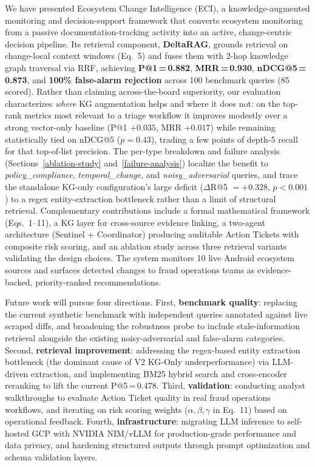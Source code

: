\documentclass[
]{article}
\begin{document}
We have presented Ecosystem Change Intelligence (ECI), a
knowledge-augmented monitoring and decision-support framework that
converts ecosystem monitoring from a passive documentation-tracking
activity into an active, change-centric decision pipeline. Its retrieval
component, \textbf{DeltaRAG}, grounds retrieval on change-local context
windows (Eq.~5) and fuses them with 2-hop knowledge graph traversal via
RRF, achieving \textbf{P@1\,=\,0.882}, \textbf{MRR\,=\,0.930},
\textbf{nDCG@5\,=\,0.873}, and \textbf{100\% false-alarm rejection}
across 100 benchmark queries (85 scored). Rather than claiming
across-the-board superiority, our evaluation characterizes \emph{where}
KG augmentation helps and where it does not: on the top-rank metrics
most relevant to a triage workflow it improves modestly over a strong
vector-only baseline (P@1 $+0.035$, MRR $+0.017$) while remaining
statistically tied on nDCG@5 ($p = 0.43$), trading a few points of
depth-5 recall for that top-of-list precision. The per-type breakdown
and failure analysis (Sections~\ref{ablation-study}
and~\ref{failure-analysis}) localize the benefit to
\textit{policy\_compliance}, \textit{temporal\_change}, and
\textit{noisy\_adversarial} queries, and trace the standalone KG-only
configuration's large deficit ($\Delta$R@5 $= +0.328$, $p < 0.001$) to
a regex entity-extraction bottleneck rather than a limit of structural
retrieval. Complementary contributions include a formal mathematical framework (Eqs.~1--11), a KG layer for cross-source evidence linking, a two-agent architecture (Sentinel + Coordinator) producing auditable Action Tickets with composite risk scoring, and an ablation study across three retrieval variants validating the design choices. The system monitors 10 live
Android ecosystem sources and surfaces detected changes to fraud operations teams as evidence-backed, priority-ranked recommendations.

Future work will pursue four directions. First, \textbf{benchmark
quality}: replacing the current synthetic benchmark with independent
queries annotated against live scraped diffs, and broadening the
robustness probe to include stale-information retrieval alongside the
existing noisy-adversarial and false-alarm categories. Second,
\textbf{retrieval improvement}: addressing the regex-based entity
extraction bottleneck (the dominant cause of V2 KG-Only
underperformance) via LLM-driven extraction, and implementing BM25
hybrid search and cross-encoder reranking to lift the current
P@5\,=\,0.478. Third, \textbf{validation}: conducting analyst
walkthroughs to evaluate Action Ticket quality in real fraud operations
workflows, and iterating on risk scoring weights ($\alpha, \beta,
\gamma$ in Eq.~11) based on operational feedback. Fourth,
\textbf{infrastructure}: migrating LLM inference to self-hosted GCP
with NVIDIA NIM/vLLM for production-grade performance and data privacy,
and hardening structured outputs through prompt optimization and schema
validation layers.
\end{document}
